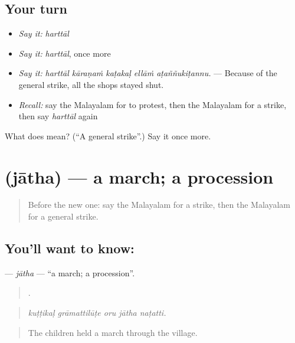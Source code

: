 \subsection*{Your turn}
\begin{itemize}
\raggedright
  \item \emph{Say it:} \emph{harttāl}
  \item \emph{Say it:} \emph{harttāl}, once more
  \item \emph{Say it:} \emph{harttāl kāraṇaṁ kaṭakaḷ ellāṁ aṭaññukiṭannu.} — Because of the general strike, all the shops stayed shut.
  \item \emph{Recall:} say the Malayalam for to protest, then the Malayalam for a strike, then say \emph{harttāl} again
\end{itemize}

\begin{tcolorbox}[breakable,colback=teal!4,colframe=teal!35!black,title={Before you move on}]
What does  mean? (\textquotedblleft{}A general strike\textquotedblright{}.) Say it once more.
\end{tcolorbox}
\section[\texorpdfstring{\ml{ജാഥ} (jātha)}{ജാഥ (jātha)}]{ (jātha) — a march; a procession}

\label{lesson:ML-C425-jatha}



\begin{quote}
Before the new one: say the Malayalam for a strike, then the Malayalam for a general strike.
\end{quote}

\subsection*{You'll want to know: }
\textbf{} — \emph{jātha} — \textquotedblleft{}a march; a procession\textquotedblright{}.

\begin{quote}
    .
\end{quote}

\begin{quote}
\emph{kuṭṭikaḷ grāmattilūṭe oru jātha naṭatti.}
\end{quote}

\begin{quote}
The children held a march through the village.
\end{quote}

